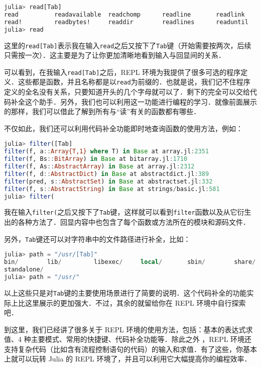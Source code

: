 \begin{lstlisting}[language=julia]
julia> read[Tab]
read          readavailable  readchomp      readline       readlink
read!         readbytes!     readdir        readlines      readuntil
julia> read
\end{lstlisting}

这里的\verb|read[Tab]|表示我在输入\verb|read|之后又按下了\verb|Tab|键（开始需要按两次，后续只需按一次）．这主要是为了让你更加清晰地看到输入与回显间的关系．

可以看到，在我输入\verb|read[Tab]|之后，REPL 环境为我提供了很多可选的程序定义．这些都是函数，并且名称都是以\verb|read|为前缀的．也就是说，我们记不住程序定义的全名没有关系，只要知道开头的几个字母就可以了．剩下的完全可以交给代码补全这个助手．另外，我们也可以利用这一功能进行编程的学习．就像前面展示的那样，我们可以借此了解到所有与“读”有关的函数都有哪些．

不仅如此，我们还可以利用代码补全功能即时地查询函数的使用方法，例如：

\begin{lstlisting}[language=julia]
julia> filter([Tab]
filter(f, a::Array{T,1} where T) in Base at array.jl:2351
filter(f, Bs::BitArray) in Base at bitarray.jl:1710
filter(f, As::AbstractArray) in Base at array.jl:2312
filter(f, d::AbstractDict) in Base at abstractdict.jl:389
filter(pred, s::AbstractSet) in Base at abstractset.jl:332
filter(f, s::AbstractString) in Base at strings/basic.jl:581
julia> filter(
\end{lstlisting}

我在输入\verb|filter(|之后又按下了\verb|Tab|键，这样就可以看到\verb|filter|函数以及从它衍生出的各种方法了．回显内容中也包含了每个函数或方法所在的模块和源码文件．

另外，\verb|Tab|键还可以对字符串中的文件路径进行补全，比如：

\begin{lstlisting}[language=julia]
julia> path = "/usr/[Tab]"
bin/        lib/         libexec/     local/       sbin/        share/       
standalone/
julia> path = "/usr/"
\end{lstlisting}


以上这些只是对\verb|Tab|键的主要使用场景进行了简要的说明．这个代码补全的功能实际上比这里展示的更加强大．不过，其余的就留给你在 REPL 环境中自行探索吧．

到这里，我们已经讲了很多关于 REPL 环境的使用方法，包括：基本的表达式求值、4 种主要模式、常用的快捷键、代码补全功能等．除此之外 ，REPL 环境还支持复杂代码（比如含有流程控制语句的代码）的输入和求值．有了这些，你基本上就可以玩转 Julia 的 REPL 环境了，并且可以利用它大幅提高你的编程效率．